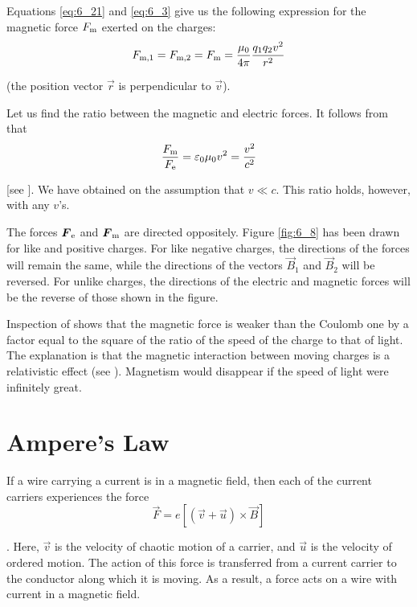 Equations \eqref{eq:6_21} and \eqref{eq:6_3} give us the following expression for the magnetic force $F_{\text{m}}$ exerted on the charges:
\begin{equation}\label{eq:6_38}
    F_{\text{m,$1$}} = F_{\text{m,$2$}} = F_{\text{m}} = \frac{\mu_0}{4\pi} \frac{q_1 q_2 v^2}{r^2}
\end{equation}

\noindent
(the position vector $\vec{r}$ is perpendicular to $\vec{v}$).

Let us find the ratio between the magnetic and electric forces. It follows from  that
\begin{equation}\label{eq:6_39}
    \frac{F_{\text{m}}}{F_{\text{e}}} = \varepsilon_0 \mu_0 v^2 = \frac{v^2}{c^2}
\end{equation}

[see ]. We have obtained  on the assumption that $v\ll c$. This ratio holds, however, with any $v$'s.

The forces $\boldsymbol{F}_{\text{e}}$ and $\boldsymbol{F}_{\text{m}}$ are directed oppositely. Figure \ref{fig:6_8} has been drawn for like and positive charges. For like negative charges, the directions of the forces will remain the same, while the directions of the vectors $\vec{B}_1$ and $\vec{B}_2$ will be reversed. For unlike charges, the directions of the electric and magnetic forces will be the reverse of those shown in the figure.

Inspection of  shows that the magnetic force is weaker than the Coulomb one by a factor equal to the square of the ratio of the speed of the charge to that of light. The explanation is that the
magnetic interaction between moving charges is a relativistic effect (see ). Magnetism would disappear if the speed of light were infinitely great.

\section{Ampere's Law}\label{sec:6_6}

If a wire carrying a current is in a magnetic field, then each of the current carriers experiences the force
\begin{equation}\label{eq:6_40}
    \vec{F} = e [(\vec{v} + \vec{u}) \times \vec{B}]
\end{equation}

. Here, $\vec{v}$ is the velocity of chaotic motion of a carrier, and $\vec{u}$ is the velocity of ordered motion. The action of this force is transferred from a current carrier to the conductor along which it is moving. As a result, a force acts on a wire with current in a magnetic field.

